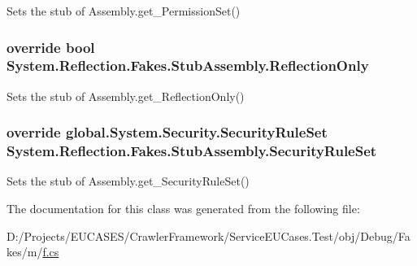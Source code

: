 Sets the stub of Assembly.\-get\-\_\-\-Permission\-Set()

\hypertarget{class_system_1_1_reflection_1_1_fakes_1_1_stub_assembly_a524f3ac7ce34190df58b9cddd95d23a6}{
\subsubsection[{Reflection\-Only}]{\setlength{\rightskip}{0pt plus 5cm}override bool System.\-Reflection.\-Fakes.\-Stub\-Assembly.\-Reflection\-Only\hspace{0.3cm}{\ttfamily [get]}}}\label{class_system_1_1_reflection_1_1_fakes_1_1_stub_assembly_a524f3ac7ce34190df58b9cddd95d23a6}


Sets the stub of Assembly.\-get\-\_\-\-Reflection\-Only()

\hypertarget{class_system_1_1_reflection_1_1_fakes_1_1_stub_assembly_acfbf35ff4a23c62c3c327e56fc417b36}{
\subsubsection[{Security\-Rule\-Set}]{\setlength{\rightskip}{0pt plus 5cm}override global.\-System.\-Security.\-Security\-Rule\-Set System.\-Reflection.\-Fakes.\-Stub\-Assembly.\-Security\-Rule\-Set\hspace{0.3cm}{\ttfamily [get]}}}\label{class_system_1_1_reflection_1_1_fakes_1_1_stub_assembly_acfbf35ff4a23c62c3c327e56fc417b36}


Sets the stub of Assembly.\-get\-\_\-\-Security\-Rule\-Set()



The documentation for this class was generated from the following file\-:\begin{DoxyCompactItemize}
\item 
D\-:/\-Projects/\-E\-U\-C\-A\-S\-E\-S/\-Crawler\-Framework/\-Service\-E\-U\-Cases.\-Test/obj/\-Debug/\-Fakes/m/\hyperlink{m_2f_8cs}{f.\-cs}\end{DoxyCompactItemize}
